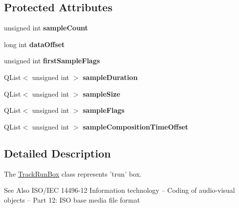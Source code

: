 \subsection*{Protected Attributes}
\begin{DoxyCompactItemize}
\item 
\hypertarget{class_track_run_box_a2c40c4b3e58288383075943389d7d559}{unsigned int {\bfseries sample\-Count}}\label{class_track_run_box_a2c40c4b3e58288383075943389d7d559}

\item 
\hypertarget{class_track_run_box_a8b699a95687b00bca377ac4d47174fb5}{long int {\bfseries data\-Offset}}\label{class_track_run_box_a8b699a95687b00bca377ac4d47174fb5}

\item 
\hypertarget{class_track_run_box_a0e643cd47b1c65e2f583a9cc0fac6e63}{unsigned int {\bfseries first\-Sample\-Flags}}\label{class_track_run_box_a0e643cd47b1c65e2f583a9cc0fac6e63}

\item 
\hypertarget{class_track_run_box_a0c45f16de9f667c4b86bdcedef87878a}{Q\-List$<$ unsigned int $>$ {\bfseries sample\-Duration}}\label{class_track_run_box_a0c45f16de9f667c4b86bdcedef87878a}

\item 
\hypertarget{class_track_run_box_a8c7ce469d771570b0ff2ad2eb2e68538}{Q\-List$<$ unsigned int $>$ {\bfseries sample\-Size}}\label{class_track_run_box_a8c7ce469d771570b0ff2ad2eb2e68538}

\item 
\hypertarget{class_track_run_box_a78ebb3f90e5a749f7ff3e43e5d5fef36}{Q\-List$<$ unsigned int $>$ {\bfseries sample\-Flags}}\label{class_track_run_box_a78ebb3f90e5a749f7ff3e43e5d5fef36}

\item 
\hypertarget{class_track_run_box_aa64e810ee629b6ef6ec2720a5653512c}{Q\-List$<$ unsigned int $>$ {\bfseries sample\-Composition\-Time\-Offset}}\label{class_track_run_box_aa64e810ee629b6ef6ec2720a5653512c}

\end{DoxyCompactItemize}


\subsection{Detailed Description}
The \hyperlink{class_track_run_box}{Track\-Run\-Box} class represents 'trun' box. 

\begin{DoxySeeAlso}{See Also}
I\-S\-O/\-I\-E\-C 14496-\/12 Information technology – Coding of audio-\/visual objects – Part 12\-: I\-S\-O base media file format 
\end{DoxySeeAlso}


